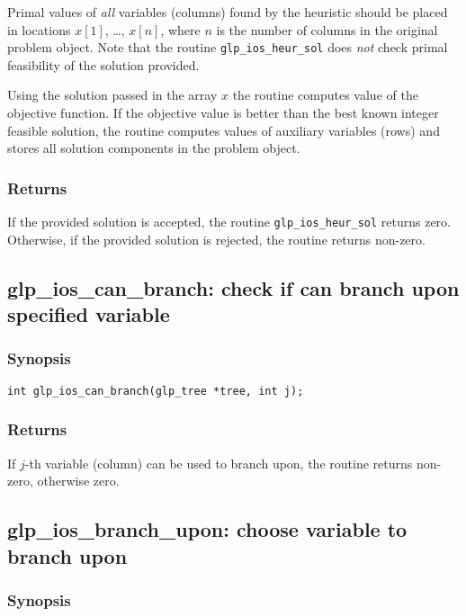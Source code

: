 Primal values of {\it all} variables (columns) found by the heuristic
should be placed in locations $x[1]$, \dots, $x[n]$, where $n$ is the
number of columns in the original problem object. Note that the routine
\verb|glp_ios_heur_sol| does {\it not} check primal feasibility of the
solution provided.

Using the solution passed in the array $x$ the routine computes value
of the objective function. If the objective value is better than the
best known integer feasible solution, the routine computes values of
auxiliary variables (rows) and stores all solution components in the
problem object.

\subsubsection*{Returns}

If the provided solution is accepted, the routine
\verb|glp_ios_heur_sol| returns zero. Otherwise, if the provided
solution is rejected, the routine returns non-zero.

\subsection{glp\_ios\_can\_branch: check if can branch upon specified
variable}

\subsubsection*{Synopsis}

\begin{verbatim}
int glp_ios_can_branch(glp_tree *tree, int j);
\end{verbatim}

\subsubsection*{Returns}

If $j$-th variable (column) can be used to branch upon, the routine
returns non-zero, otherwise zero.

\newpage

\subsection{glp\_ios\_branch\_upon: choose variable to branch upon}

\subsubsection*{Synopsis}

